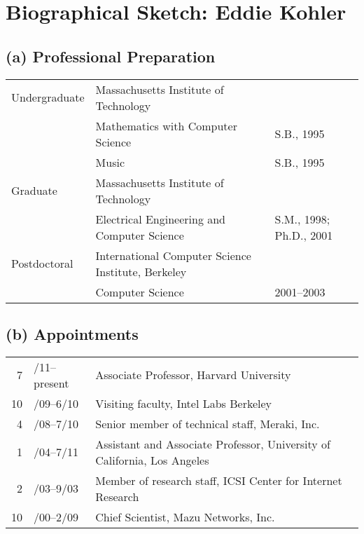 \documentclass[11pt]{article}
\begin{document}
\setcounter{section}{4}

\section*{Biographical Sketch: Eddie Kohler}

\subsection*{(a) Professional Preparation}

\begin{flushleft}
\begin{tabular}{@{}lll@{}}
Undergraduate & Massachusetts Institute of Technology \\
	& Mathematics with Computer Science	& S.B., 1995 \\
	& Music					& S.B., 1995 \\
Graduate & Massachusetts Institute of Technology \\
	& Electrical Engineering and Computer Science & S.M., 1998;
						Ph.D., 2001 \\
Postdoctoral & International Computer Science Institute, Berkeley \\
	& Computer Science			& 2001--2003
\end{tabular}
\end{flushleft}


\subsection*{(b) Appointments}

\begin{flushleft}
\begin{tabular}{@{}r@{}ll@{}}
7&/11--present & Associate Professor, Harvard University \\
10&/09--6/10 & Visiting faculty, Intel Labs Berkeley \\
4&/08--7/10 & Senior member of technical staff, Meraki, Inc. \\
1&/04--7/11 & Assistant and Associate Professor, University of California, Los Angeles
\\
2&/03--9/03 & Member of research staff, ICSI Center for Internet
Research \\
10&/00--2/09 & Chief Scientist, Mazu Networks, Inc. \\
\end{tabular}
\end{flushleft}
\end{document}
